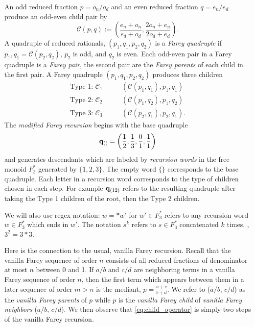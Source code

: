 \documentclass[12pt]{amsart}
\begin{document}
An odd reduced fraction $p = o_n/o_d$ and an even reduced fraction $q = e_n/e_d$ produce an odd-even child pair by
\begin{equation} \label{eq:child_operator}
\mathcal{C}(p,q) := \left( \frac{e_n+o_n}{e_d+o_d}, \frac{2 o_n + e_n}{2 o_d + e_d} \right). 
\end{equation}
A quadruple of reduced rationals, $(p_1, q_1, p_2, q_2)$ is a {\it Farey quadruple} if $p_1,q_1 = \mathcal{C}(p_2,q_2)$, $p_2$ is odd, and $q_2$ is even. Each odd-even pair in a Farey quadruple is a {\it Farey pair},  the second pair are the {\it Farey parents} 
of each child in the first pair. A Farey quadruple $(p_1,q_1, p_2,q_2)$
produces three children
\begin{equation} \label{eq:child_farey_quad}
\begin{aligned}
\mbox{Type 1: $\mathcal{C}_1$} \qquad & \left(\mathcal{C}(p_1,q_1), p_1, q_1 \right)  \\
\mbox{Type 2: $\mathcal{C}_2$} \qquad & \left(\mathcal{C}(p_1,q_2), p_1, q_2 \right)  \\
\mbox{Type 3: $\mathcal{C}_3$} \qquad  & \left(\mathcal{C}(p_2,q_1), p_2, q_1\right). 
\end{aligned}	
\end{equation}
The {\it modified Farey recursion} begins with the base quadruple
\begin{equation} \label{eq:base_quadruple}
\mathbf{q}_{()} = \left( \frac{1}{2}, \frac{1}{3}, \frac{0}{1}, \frac{1}{1} \right) 
\end{equation}
and generates descendants which are labeled by {\it recursion words} in the free monoid $F_3^{*}$ generated by $\{1,2,3\}$. The empty word $\{\}$ corresponds to the base quadruple. Each letter in a recursion word corresponds to the type of children chosen in each step. 
For example $\mathbf{q}_{(12)}$ refers to the resulting quadruple after taking the Type 1 children of the root, then the Type 2 children. 

We will also use regex notation: $w = *w'$ for $w' \in F_3^*$ refers to any recursion word $w \in F_3^*$ which ends in $w'$.  
The notation $s^k$ refers to $s \in F_3^*$ concatenated $k$ times, \eg, $3^2 = 3*3$. 

Here is the connection to the usual, vanilla Farey recursion. Recall that the vanilla Farey sequence of order $n$ consists of all 
reduced fractions of denominator at most $n$ between 0 and 1. If $a/b$ and $c/d$ are neighboring terms
in a vanilla Farey sequence of order $n$, then the first term which appears between them in a later sequence
of order $m > n$ is the mediant, $p = \frac{a + c}{b + d}$.  We refer to ($a/b$, $c/d$) as the {\it vanilla Farey 
parents} of $p$ while $p$ is the {\it vanilla Farey child} of {\it vanilla Farey neighbors} ($a/b$,  $c/d$). 
We then observe that \eqref{eq:child_operator} is simply two steps of the vanilla Farey recursion.
\end{document}
